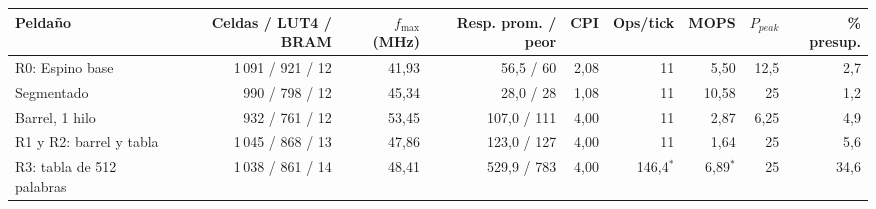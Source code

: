 \begin{tabular}{lrrrrrrrr}
\toprule
Peldaño & Celdas / LUT4 / BRAM & $f_{\max}$ (MHz) & Resp. prom. / peor & CPI & Ops/tick & MOPS & $P_{peak}$ & \% presup. \\
\midrule
R0: Espino base & 1\,091 / 921 / 12 & 41{,}93 & 56{,}5 / 60 & 2{,}08 & 11 & 5{,}50 & 12{,}5 & 2{,}7 \\
Segmentado & 990 / 798 / 12 & 45{,}34 & 28{,}0 / 28 & 1{,}08 & 11 & 10{,}58 & 25 & 1{,}2 \\
Barrel, 1 hilo & 932 / 761 / 12 & 53{,}45 & 107{,}0 / 111 & 4{,}00 & 11 & 2{,}87 & 6{,}25 & 4{,}9 \\
R1 y R2: barrel y tabla & 1\,045 / 868 / 13 & 47{,}86 & 123{,}0 / 127 & 4{,}00 & 11 & 1{,}64 & 25 & 5{,}6 \\
\midrule
R3: tabla de 512 palabras & 1\,038 / 861 / 14 & 48{,}41 & 529{,}9 / 783 & 4{,}00 & 146{,}4$^*$ & 6{,}89$^*$ & 25 & 34{,}6 \\
\bottomrule
\end{tabular}
